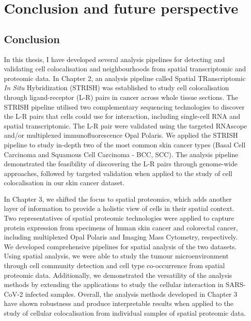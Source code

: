 \chapter[Conclusion and future perspective]{Conclusion and future perspective}
\label{Chap:Conclusion}
\pagestyle{headings}
\section{Conclusion}
In this thesis, I have developed several analysis pipelines for detecting and validating cell colocalisation and neighbourhoods from spatial transcriptomic and proteomic data. In Chapter 2, an analysis pipeline called Spatial TRanscriptomic \textit{In Situ} Hybridization (STRISH) was established to study cell colocalisation through ligand-receptor (L-R) pairs in cancer across whole tissue sections. The STRISH pipeline utilised two complementary sequencing technologies to discover the L-R pairs that cells could use for interaction, including single-cell RNA and spatial transcriptomic. The L-R pair were validated using the targeted RNAscope and/or multiplexed immunofluorescence Opal Polaris. We applied the STRISH pipeline to study in-depth two of the most common skin cancer types (Basal Cell Carcinoma and Squamous Cell Carcinoma - BCC, SCC). The analysis pipeline demonstrated the feasibility of discovering the L-R pairs through genome-wide approaches, followed by targeted validation when applied to the study of cell colocalisation in our skin cancer dataset. 

In Chapter 3, we shifted the focus to spatial proteomics, which adds another layer of information to provide a holistic view of cells in their spatial context. Two representatives of spatial proteomic technologies were applied to capture protein expression from specimens of human skin cancer and colorectal cancer, including multiplexed Opal Polaris and Imaging Mass Cytometry, respectively. We developed comprehensive pipelines for spatial analysis of the two datasets. Using spatial analysis, we were able to study the tumour microenvironment through cell community detection and cell type co-occurrence from spatial proteomic data. Additionally, we demonstrated the versatility of the analysis methods by extending the applications to study the cellular interaction in SARS-CoV-2 infected samples. Overall, the analysis methods developed in Chapter 3 have shown robustness and produce interpretable results when applied to the study of cellular colocalisation from individual samples of spatial proteomic data.

